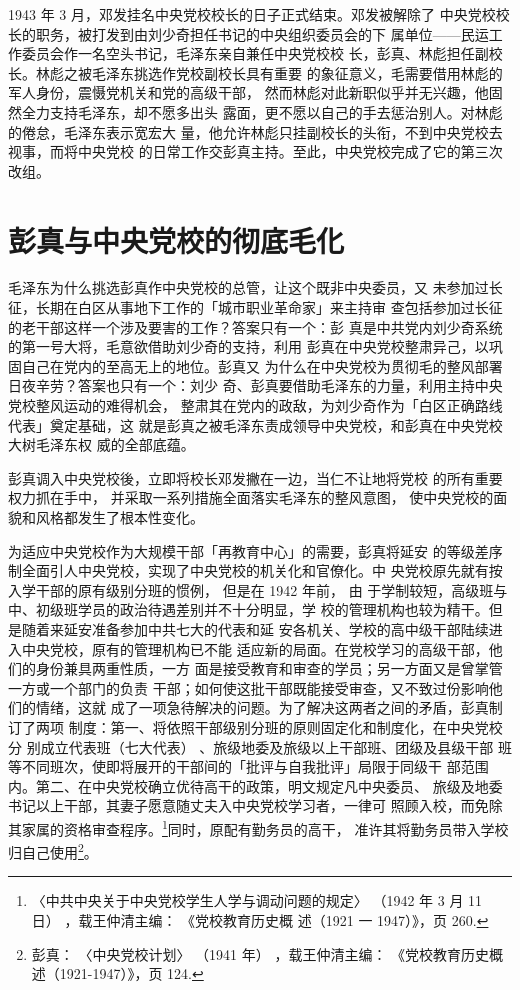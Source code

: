 1943 年 3 月，邓发挂名中央党校校长的日子正式结束。邓发被解除了
中央党校校长的职务，被打发到由刘少奇担任书记的中央组织委员会的下
属单位——民运工作委员会作一名空头书记，毛泽东亲自兼任中央党校校
长，彭真、林彪担任副校长。林彪之被毛泽东挑选作党校副校长具有重要
的象征意义，毛需要借用林彪的军人身份，震慑党机关和党的高级干部，
然而林彪对此新职似乎并无兴趣，他固然全力支持毛泽东，却不愿多出头
露面，更不愿以自己的手去惩治别人。对林彪的倦怠，毛泽东表示宽宏大
量，他允许林彪只挂副校长的头衔，不到中央党校去视事，而将中央党校
的日常工作交彭真主持。至此，中央党校完成了它的第三次改组。

\section{彭真与中央党校的彻底毛化}
毛泽东为什么挑选彭真作中央党校的总管，让这个既非中央委员，又
未参加过长征，长期在白区从事地下工作的「城市职业革命家」来主持审
查包括参加过长征的老干部这样一个涉及要害的工作？答案只有一个：彭
真是中共党内刘少奇系统的第一号大将，毛意欲借助刘少奇的支持，利用
彭真在中央党校整肃异己，以巩固自己在党内的至高无上的地位。彭真又
为什么在中央党校为贯彻毛的整风部署日夜辛劳？答案也只有一个：刘少
奇、彭真要借助毛泽东的力量，利用主持中央党校整风运动的难得机会，
整肃其在党内的政敌，为刘少奇作为「白区正确路线代表」奠定基础，这
就是彭真之被毛泽东责成领导中央党校，和彭真在中央党校大树毛泽东权
威的全部底蕴。

彭真调入中央党校後，立即将校长邓发撇在一边，当仁不让地将党校
的所有重要权力抓在手中，
并采取一系列措施全面落实毛泽东的整风意图，
使中央党校的面貌和风格都发生了根本性变化。

为适应中央党校作为大规模干部「再教育中心」的需要，彭真将延安
的等级差序制全面引人中央党校，实现了中央党校的机关化和官僚化。中
央党校原先就有按入学干部的原有级别分班的惯例，
但是在 1942 年前，
由
于学制较短，高级班与中、初级班学员的政治待遇差别并不十分明显，学
校的管理机构也较为精干。但是随着来延安准备参加中共七大的代表和延
安各机关、学校的高中级干部陆续进入中央党校，原有的管理机构已不能
适应新的局面。在党校学习的高级干部，他们的身份兼具两重性质，一方
面是接受教育和审查的学员；另一方面又是曾掌管一方或一个部门的负责
干部；如何使这批干部既能接受审查，又不致过份影响他们的情绪，这就
成了一项急待解决的问题。为了解决这两者之间的矛盾，彭真制订了两项
制度：第一、将依照干部级别分班的原则固定化和制度化，在中央党校分
别成立代表班（七大代表）
、旅级地委及旅级以上干部班、团级及县级干部
班等不同班次，使即将展开的干部间的「批评与自我批评」局限于同级干
部范围内。第二、在中央党校确立优待高干的政策，明文规定凡中央委员、
旅级及地委书记以上干部，其妻子愿意随丈夫入中央党校学习者，一律可
照顾入校，而免除其家属的资格审查程序。\footnote{〈中共中央关于中央党校学生人学与调动问题的规定〉
（1942 年 3 月 11 日）
，载王仲清主编：
《党校教育历史概
述（1921 一 1947）》，页 260.}同时，原配有勤务员的高干，
准许其将勤务员带入学校归自己使用\footnote{彭真：
〈中央党校计划〉
（1941 年）
，载王仲清主编：
《党校教育历史概述（1921-1947）》，页 124.}。


